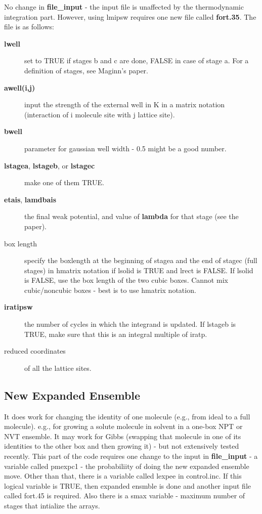 \documentclass[12pt,letterpaper]{article}
\begin{document}
No change in {\bf file\_input} - the input file is
unaffected by the thermodynamic integration part. However,
using lmipsw requires one new file called {\bf fort.35}. The
file is as follows:
\begin{description}
\item[{\bf lwell}] set to TRUE if stages b and c are done,
  FALSE in case of stage a. For a definition of stages, see
  Maginn's paper.
\item[{\bf awell(i,j)}] input the strength of the external
  well in K in a matrix notation (interaction of i molecule
  site with j lattice site).
\item[{\bf bwell}] parameter for gaussian well width - 0.5
  might be a good number.
\item[{\bf lstagea}, {\bf lstageb}, or {\bf lstagec}] make
  one of them TRUE.
\item[{\bf etais}, {\bf lamdbais}] the final weak potential,
  and value of {\bf lambda} for that stage (see the
  paper).
\item[box length] specify the boxlength at the beginning of
  stagea and the end of stagec (full stages) in hmatrix
  notation if lsolid is TRUE and lrect is FALSE. If lsolid
  is FALSE, use the box length of the two cubic boxes.
  Cannot mix cubic/noncubic boxes - best is to use hmatrix
  notation.
\item[{\bf iratipsw}] the number of cycles in which the
  integrand is updated. If lstageb is TRUE, make sure that
  this is an integral multiple of iratp.
\item[reduced coordinates] of all the lattice sites.
\end{description}

\subsection{New Expanded Ensemble}
It does work for changing the identity of one molecule
(e.g., from ideal to a full molecule). e.g., for growing a
solute molecule in solvent in a one-box NPT or NVT ensemble.
It may work for Gibbs (swapping that molecule in one of its
identities to the other box and then growing it) - but not
extensively tested recently. This part of the code requires
one change to the input in {\bf file\_input} - a variable
called pmexpc1 - the probabiliity of doing the new expanded
ensemble move. Other than that, there is a variable called
lexpee in control.inc. If this logical variable is TRUE,
then expanded ensmble is done and another input file called
fort.45 is required. Also there is a smax variable - maximum
number of stages that intialize the arrays.
\end{document}
